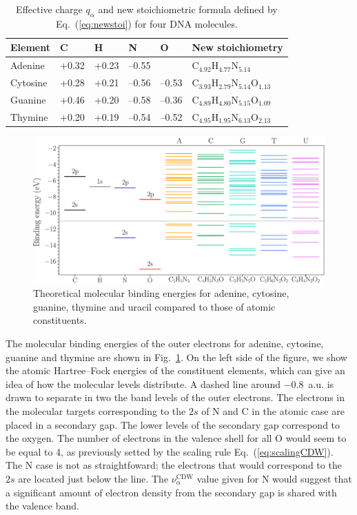 \documentclass[preprint,12pt]{article}
\begin{document}
\begin{table}[H]
\begin{center}
\begin{tabular}{|p{}|p{}|p{}|p{
}|p{}|p{}|}
\hline
Element & C & H & N & O & New stoichiometry \\
\hline
Adenine & +0.32 & +0.23 & --0.55 &       & 
C$_{4.92}$H$_{4.77}$N$_{5.14}$ \\ 
\hline
Cytosine & +0.28 & +0.21 & --0.56 & --0.53 & 
C$_{3.93}$H$_{2.79}$N$_{5.14}$O$_{1.13}$ \\ 
\hline
Guanine & +0.46 & +0.20 & --0.58 & --0.36 & 
C$_{4.89}$H$_{4.80}$N$_{5.15}$O$_{1.09}$ \\ 
\hline
Thymine & +0.20 & +0.19 & --0.54 & --0.52 & 
C$_{4.95}$H$_{1.95}$N$_{6.13}$O$_{2.13}$ \\ 
\hline
\end{tabular}
\caption{Effective charge $q_{\alpha}$ and new stoichiometric formula 
defined by Eq.~(\ref{eq:newstoi}) for four DNA molecules.}
\label{tab:newstoi}
\end{center}
\end{table}

\begin{figure}[t!]
\centering
\includegraphics[width=\textwidth]{figuras/levelsDNA.eps}
\caption{Theoretical molecular binding energies for adenine, cytosine, 
guanine, thymine and uracil compared to those of atomic constituents.}
\label{fig:bindener}
\end{figure}

The molecular binding energies of the outer electrons for adenine, 
cytosine, guanine and thymine are shown in Fig.~\ref{fig:bindener}. 
On the left side of the figure, we show the atomic Hartree--Fock energies 
of the constituent elements, which can give an idea of how the molecular 
levels distribute. A dashed line around $-0.8$~a.u. is drawn to separate 
in two the band levels of the outer electrons. The electrons in the molecular 
targets corresponding to the $2s$ of N and C in the atomic case are 
placed in a secondary gap. The lower levels of the secondary gap 
correspond to the oxygen. The number of electrons in the valence 
shell for all O would seem to be equal to 4, as previously setted by the 
scaling rule Eq.~(\ref{eq:scalingCDW}). The N case is not as 
straightfoward; the electrons that would correspond to the $2s$ are 
located just below the line. The $\nu_{\alpha }^{\text{CDW}}$ value 
given for N would suggest that a significant amount of electron density 
from the secondary gap is shared with the valence band.
\end{document}
